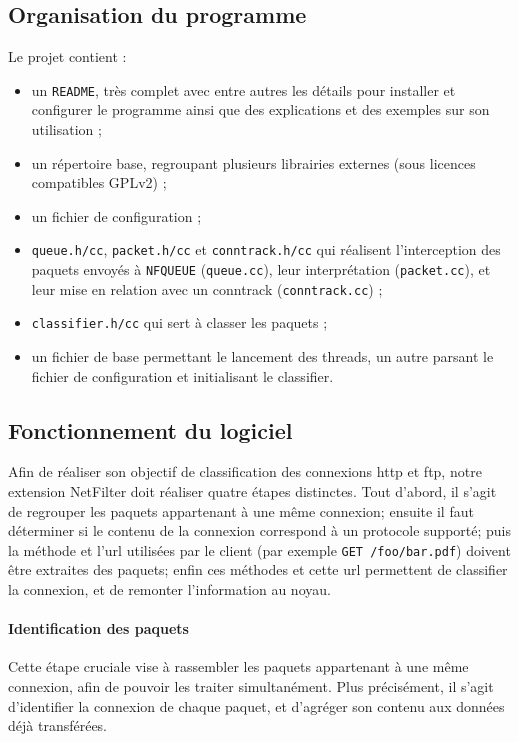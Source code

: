 \subsection{Organisation du programme}
  Le projet contient :
  \begin{itemize}
    \item un \verb+README+, très complet avec entre autres les détails pour installer et configurer le programme ainsi que des explications et des exemples sur son utilisation ;
    \item un répertoire base, regroupant plusieurs librairies externes (sous
    licences compatibles GPLv2) ;
    \item un fichier de configuration ;
    \item \verb+queue.h/cc+, \verb+packet.h/cc+ et \verb+conntrack.h/cc+ qui réalisent l'interception des paquets envoyés à \verb+NFQUEUE+ (\verb+queue.cc+), leur
    interprétation (\verb+packet.cc+), et leur mise en relation avec un conntrack
    (\verb+conntrack.cc+) ;
    \item \verb+classifier.h/cc+ qui sert à classer les paquets ;
    \item un fichier de base permettant le lancement des threads, un autre parsant le fichier de configuration et initialisant le classifier.
  \end{itemize}

\subsection{Fonctionnement du logiciel}
  Afin de réaliser son objectif de classification des connexions http et ftp, notre extension NetFilter doit
  réaliser quatre étapes distinctes. Tout d'abord, il s'agit de regrouper les paquets appartenant à une même
  connexion; ensuite il faut déterminer si le contenu de la connexion correspond à un protocole supporté;
  puis la méthode et l'url utilisées par le client (par exemple {\tt GET /foo/bar.pdf}) doivent être extraites
  des paquets; enfin ces méthodes et cette url permettent de classifier la connexion, et de remonter l'information
  au noyau.
  
  \paragraph{Identification des paquets}
    Cette étape cruciale vise à rassembler les paquets appartenant à une même connexion, afin de pouvoir
    les traiter simultanément. Plus précisément, il s'agit d'identifier la connexion de chaque paquet,
    et d'agréger son contenu aux données déjà transférées.
    
